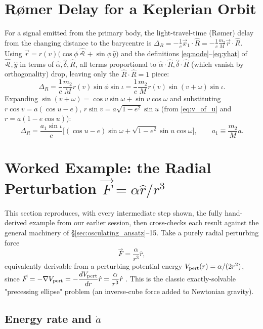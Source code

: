 \documentclass[11pt]{article}
\newcommand{\vecr}{\vec r}
\newcommand{\vecF}{\vec F}
\newcommand{\vecx}{\vec x}
\newcommand{\hatn}{\hat \leo}
\newcommand{\rhat}{\hat r}
\begin{document}
\section{Rømer Delay for a Keplerian Orbit}

For a signal emitted from the primary body, the light-travel-time (Rømer) delay from the changing distance to the barycentre is $\Delta_R = -\tfrac1c\vecx_1\cdot\hat R = -\tfrac1c\tfrac{m_2}{M}\vecr\cdot\hat R$. Using $\vecr=r(v)\big(\cos\phi\,\hatn+\sin\phi\,\hat y\big)$ and the definitions \eqref{eq:node}--\eqref{eq:yhat} of $\hatn,\hat y$ in terms of $\hat\alpha,\hat\delta,\hat R$, all terms proportional to $\hat\alpha\cdot\hat R,\hat\delta\cdot\hat R$ (which vanish by orthogonality) drop, leaving only the $\hat R\cdot\hat R=1$ piece:
\[
\Delta_R = \frac1c\frac{m_2}{M}r(v)\sin\phi\sin\iota = \frac1c\frac{m_2}{M}r(v)\sin(v+\omega)\sin\iota.
\]
Expanding $\sin(v+\omega)=\cos v\sin\omega+\sin v\cos\omega$ and substituting $r\cos v = a(\cos u - e)$, $r\sin v = a\sqrt{1-e^2}\sin u$ (from \eqref{eq:v_of_u} and $r=a(1-e\cos u)$):
\begin{equation}
\Delta_R = \frac{a_1\sin\iota}{c}\Big[(\cos u - e)\sin\omega+\sqrt{1-e^2}\sin u\cos\omega\Big], \qquad a_1\equiv \frac{m_2}{M}a. \label{eq:romer}
\end{equation}

\section{Worked Example: the Radial Perturbation $\vecF=\alpha\rhat/r^3$}
\label{sec:worked}

This section reproduces, with every intermediate step shown, the fully hand-derived example from our earlier session, then cross-checks each result against the general machinery of \S\ref{sec:osculating_ansatz}--15. Take a purely radial perturbing force
\begin{equation}
\vecF = \frac{\alpha}{r^3}\rhat, \label{eq:worked_force}
\end{equation}
equivalently derivable from a perturbing potential energy $V_{\rm pert}(r)=\alpha/(2r^2)$, since $\vecF=-\nabla V_{\rm pert}=-\dfrac{dV_{\rm pert}}{dr}\rhat = \dfrac{\alpha}{r^3}\rhat$ \checkmark. This is the classic exactly-solvable "precessing ellipse" problem (an inverse-cube force added to Newtonian gravity).

\subsection{Energy rate and $\dot a$}
\end{document}
